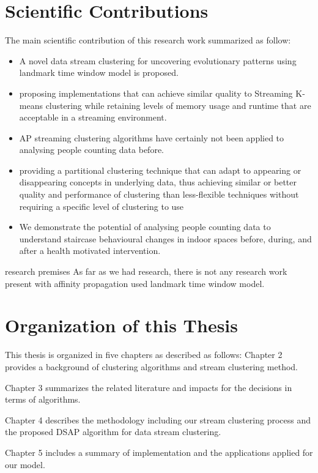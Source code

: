 \section{Scientific Contributions}


The main scientific contribution of this research work summarized as follow:

\begin{itemize}
    \item A novel data stream clustering for uncovering evolutionary patterns using landmark time window model is proposed. 
    \item proposing implementations that can achieve similar quality to  Streaming K-means clustering while retaining levels of memory usage and runtime that are acceptable in a streaming environment.
    \item AP streaming clustering algorithms have certainly not been applied to analysing people counting data before.
    \item  providing a partitional clustering technique that can adapt to appearing or disappearing concepts in underlying data, thus achieving similar or better quality and performance of clustering than less-flexible techniques without requiring a specific level of clustering to use
    \item We demonstrate the potential of analysing people counting data to understand staircase behavioural changes in indoor spaces before, during, and after a health motivated intervention.
\end{itemize}


\todo[inline]{}research premises 
As far as we had research, there is not any research work present with affinity propagation used landmark time window model.


\section{Organization of this Thesis}
This thesis is organized in five chapters as described as follows:
Chapter 2 provides a background of clustering algorithms and stream clustering method. 

Chapter 3 summarizes the related literature and impacts for the decisions in terms of algorithms.

Chapter 4 describes the methodology including our stream clustering process and the proposed DSAP algorithm for data stream clustering.

Chapter 5 includes a summary of implementation and the applications applied for our model.

